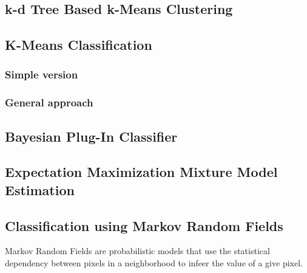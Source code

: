 \subsection{k-d Tree Based k-Means Clustering}
\label{sec:KdTreeBasedKMeansClustering}
\ifitkFullVersion

\fi

\subsection{K-Means Classification}
\label{sec:KMeansClassifier}
\subsubsection{Simple version}
\ifitkFullVersion

\fi
\ifitkFullVersion

\fi

\subsubsection{General approach}
\ifitkFullVersion

\fi


\subsection{Bayesian Plug-In Classifier}
\label{sec:BayesianPluginClassifier}

\ifitkFullVersion 

\fi


\subsection{Expectation Maximization Mixture Model Estimation}
\label{sec:ExpectationMaximizationMixtureModelEstimation}

\ifitkFullVersion 

\fi

\subsection{Classification using Markov Random Fields}
\label{sec:MarkovRandomField}

Markov Random Fields are probabilistic models that use the statistical
dependency between
pixels in a neighborhood to infeer the value of a give pixel.

